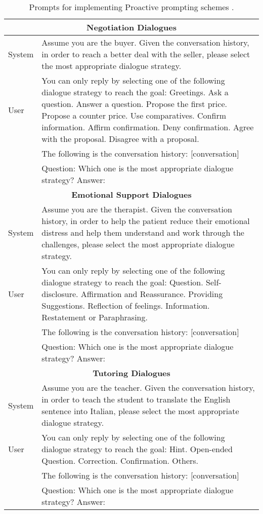 \documentclass{article} %
\begin{document}
\begin{table}[h]
    \centering
    \begin{tabular}{lp{11cm}}
    \toprule
    \multicolumn{2}{c}{\textbf{Negotiation Dialogues}}\\
    \midrule
    System   &  Assume you are the buyer. Given the conversation history, in order to reach a better deal with the seller, please select the most appropriate dialogue strategy.\\
    \midrule
    User    &  You can only reply by selecting one of the following dialogue strategy to reach the goal: Greetings. Ask a question. Answer a question. Propose the first price. Propose a counter price. Use comparatives. Confirm information. Affirm confirmation. Deny confirmation. Agree with the proposal. Disagree with a proposal. \\
    & The following is the conversation history: [conversation]\\
    & Question: Which one is the most appropriate dialogue strategy? Answer: \\
    \midrule
    \midrule
    \multicolumn{2}{c}{\textbf{Emotional Support Dialogues}}\\
    \midrule
    System   &  Assume you are the therapist. Given the conversation history, in order to help the patient reduce their emotional distress and help them understand and work through the challenges, please select the most appropriate dialogue strategy.\\
    \midrule
    User    &  You can only reply by selecting one of the following dialogue strategy to reach the goal: Question. Self-disclosure. Affirmation and Reassurance. Providing Suggestions. Reflection of feelings. Information. Restatement or Paraphrasing.\\
    & The following is the conversation history: [conversation]\\
    & Question: Which one is the most appropriate dialogue strategy? Answer: \\
    \midrule
    \midrule
    \multicolumn{2}{c}{\textbf{Tutoring Dialogues}}\\
    \midrule
    System   &  Assume you are the teacher. Given the conversation history, in order to teach the student to translate the English sentence into Italian, please select the most appropriate dialogue strategy. \\
    \midrule
    User    &  You can only reply by selecting one of the following dialogue strategy to reach the goal: Hint. Open-ended Question. Correction. Confirmation. Others.\\
    & The following is the conversation history: [conversation]\\
    & Question: Which one is the most appropriate dialogue strategy? Answer: \\
    \bottomrule
    \end{tabular}
    \caption{Prompts for implementing Proactive prompting schemes \citep{llm-proactive}.}
    \label{tab:proactive_prompt}
\end{table}
\end{document}
